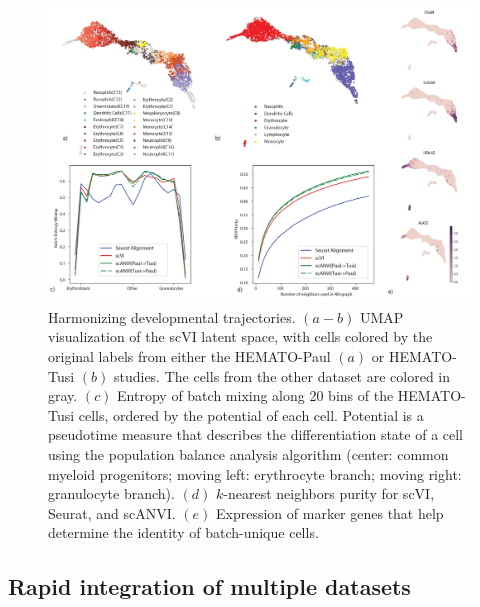 \begin{figure}[htp]
\centering
\includegraphics[width=\textwidth]{figures/continuous.jpg}
\caption[Harmonizing developmental trajectories]{Harmonizing developmental trajectories. $(a-b)$ UMAP visualization of the scVI latent space, with cells colored by the original labels from either the HEMATO-Paul $(a)$ or HEMATO-Tusi $(b)$ studies. The cells from the other dataset are colored in gray. $(c)$ Entropy of batch mixing along 20 bins of the HEMATO-Tusi cells, ordered by the potential of each cell. Potential is a pseudotime measure that describes the differentiation state of a cell using the population balance analysis algorithm (center: common myeloid progenitors; moving left: erythrocyte branch; moving right: granulocyte branch). $(d)$ $k$-nearest neighbors purity for scVI, Seurat, and scANVI. $(e)$ Expression of marker genes that help determine the identity of batch-unique cells.} 
\label{scanvicontinuous_panel}
\end{figure}

\subsection{Rapid integration of multiple datasets}

